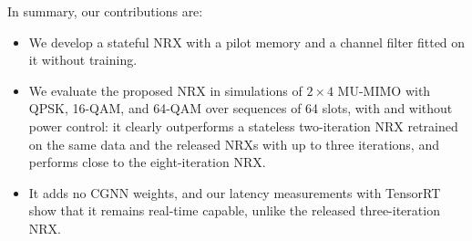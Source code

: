 In summary, our contributions are:
\begin{itemize}
\item We develop a stateful NRX with a pilot memory and a channel filter fitted on it without training.
\item We evaluate the proposed NRX in simulations of $2\times 4$ MU-MIMO with QPSK, 16-QAM, and 64-QAM over sequences of 64 slots, with and without power control: it clearly outperforms a stateless two-iteration NRX retrained on the same data and the released NRXs with up to three iterations, and performs close to the eight-iteration NRX.
\item It adds no CGNN weights, and our latency measurements with TensorRT show that it remains real-time capable, unlike the released three-iteration NRX.
\end{itemize}
